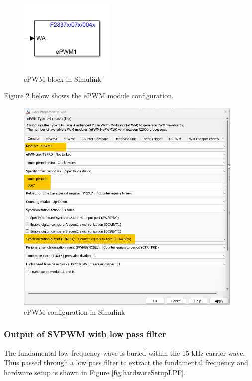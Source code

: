 \begin{figure}[H]
	\centering
	\includegraphics[width=1.8in]{sections/section6/images/SVPWM/ePWMBlock.png}
	\caption{ePWM block in Simulink}
	\label{fig:svpwm_block}
\end{figure}

Figure \ref{fig:ePWMTBPRD} below shows the ePWM module configuration.

\begin{figure}[H]
	\centering
	\includegraphics[width=4.3in]{sections/section6/images/SVPWM/ePWMTBPRD.png}
	\caption{ePWM configuration in Simulink}
	\label{fig:ePWMTBPRD}
\end{figure}

\subsubsection{Output of SVPWM with low pass filter}


The fundamental low frequency wave is buried within the 15 kHz carrier wave. Thus passed through a low pass filter to extract the fundamental frequency and hardware setup is shown in Figure \ref{fig:hardwareSetupLPF}.

